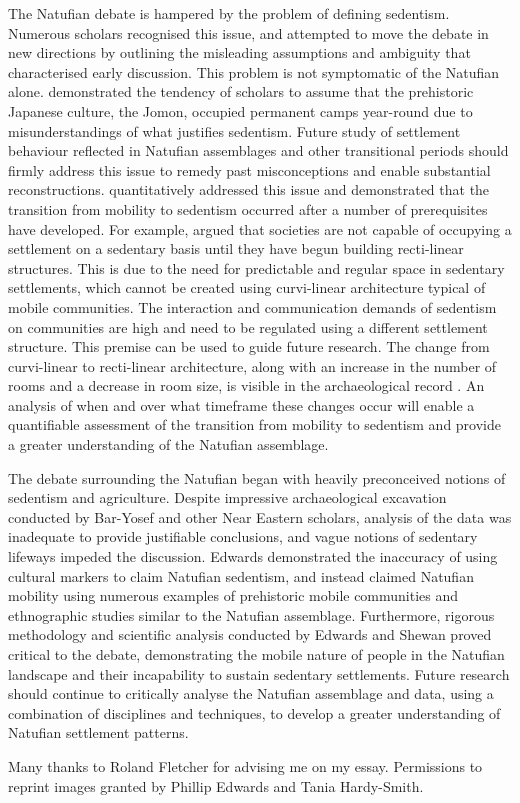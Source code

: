 The Natufian debate is hampered by the problem of defining sedentism. Numerous scholars recognised this issue, and attempted to move the debate in new directions by outlining the misleading assumptions and ambiguity that characterised early discussion. This problem is not symptomatic of the Natufian alone. 
\textcite{Habu_1996} demonstrated the tendency of scholars to assume that the prehistoric Japanese culture, the Jomon, occupied permanent camps year-round due to misunderstandings of what justifies sedentism. Future study of settlement behaviour reflected in Natufian assemblages and other transitional periods should firmly address this issue to remedy past misconceptions and enable substantial reconstructions. 
\textcite{Fletcher_2007} quantitatively addressed this issue and demonstrated that the transition from mobility to sedentism occurred after a number of prerequisites have developed. 
For example, \textcite{Fletcher_2007} argued that societies are not capable of occupying a settlement on a sedentary basis until they have begun building recti-linear structures. This is due to the need for predictable and regular space in sedentary settlements, which cannot be created using curvi-linear architecture typical of mobile communities. The interaction and communication demands of sedentism on communities are high and need to be regulated using a different settlement structure. This premise can be used to guide future research. 
The change from curvi-linear to recti-linear architecture, along with an increase in the number of rooms and a decrease in room size, is visible in the archaeological record \parencite{Byrd_2005}. An analysis of when and over what timeframe these changes occur will enable a quantifiable assessment of the transition from mobility to sedentism and provide a greater understanding of the Natufian assemblage.

The debate surrounding the Natufian began with heavily preconceived notions of sedentism and agriculture. Despite impressive archaeological excavation conducted by Bar-Yosef and other Near Eastern scholars, analysis of the data was inadequate to provide justifiable conclusions, and vague notions of sedentary lifeways impeded the discussion. Edwards demonstrated the inaccuracy of using cultural markers to claim Natufian sedentism, and instead claimed Natufian mobility using numerous examples of prehistoric mobile communities and ethnographic studies similar to the Natufian assemblage. Furthermore, rigorous methodology and scientific analysis conducted by Edwards and Shewan proved critical to the debate, demonstrating the mobile nature of people in the Natufian landscape and their incapability to sustain sedentary settlements. Future research should continue to critically analyse the Natufian assemblage and data, using a combination of disciplines and techniques, to develop a greater understanding of Natufian settlement patterns.

\IJSRAseparator
{}
Many thanks to Roland Fletcher for advising me on my essay. 
Permissions to reprint images granted by Phillip Edwards and Tania Hardy-Smith.
\IJSRAclosing%
%